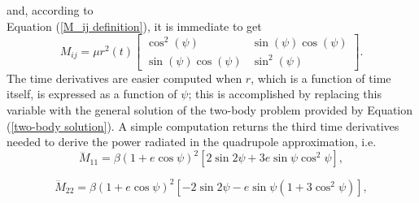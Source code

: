 and, according to \\Equation (\ref{M_ij definition}), it is immediate to get
\begin{equation}
M_{ij} = \mu r^2(t)\begin{bmatrix}
\cos^2(\psi) & \sin{(\psi)\cos(\psi)} \\
\sin{(\psi)\cos(\psi)} & \sin^2(\psi)
\end{bmatrix}.
\end{equation}
The time derivatives are easier computed when $r$, which is a function of time itself, is expressed as a function of $\psi$; this is accomplished by replacing this variable with the general solution of the two-body problem provided by Equation (\ref{two-body solution}). A simple computation returns the third time derivatives needed to derive the power radiated in the quadrupole approximation, i.e.
\begin{equation}\label{d3M _11/dt3}  
\dddot{M}_{11} = \beta (1 + e \cos \psi)^2 \left[ 2 \sin 2\psi + 3e \sin \psi \cos^2 \psi \right],
\end{equation}

\begin{equation}\label{d3M _22/dt3}  
    \dddot{M}_{22} = \beta (1 + e \cos \psi)^2 \left[ -2 \sin 2\psi - e \sin \psi (1 + 3 \cos^2 \psi) \right],
\end{equation}


